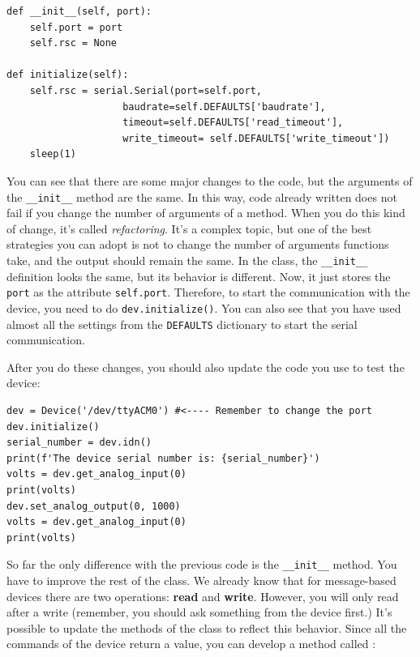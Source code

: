 \begin{verbatim}
def __init__(self, port):
    self.port = port
    self.rsc = None

def initialize(self):
    self.rsc = serial.Serial(port=self.port,
                    baudrate=self.DEFAULTS['baudrate'],
                    timeout=self.DEFAULTS['read_timeout'],
                    write_timeout= self.DEFAULTS['write_timeout'])
    sleep(1)
\end{verbatim}

You can see that there are some major changes to the code, but the arguments of the \texttt{__init__} method are the same. In this way, code already written does not fail if you change the number of arguments of a method. When you do this kind of change, it's called \emph{refactoring}. It's a complex topic, but one of the best strategies you can adopt is not to change the number of arguments functions take, and the output should remain the same. In the class, the \texttt{__init__} definition looks the same, but its behavior is different. Now, it just stores the \texttt{port} as the attribute \texttt{self.port}. Therefore, to start the communication with the device, you need to do \texttt{dev.initialize()}. You can also see that you have used almost all the settings from the \texttt{DEFAULTS} dictionary to start the serial communication.

After you do these changes, you should also update the code you use to test the device:

\begin{verbatim}
dev = Device('/dev/ttyACM0') #<---- Remember to change the port
dev.initialize()
serial_number = dev.idn()
print(f'The device serial number is: {serial_number}')
volts = dev.get_analog_input(0)
print(volts)
dev.set_analog_output(0, 1000)
volts = dev.get_analog_input(0)
print(volts)
\end{verbatim}

\sloppy So far the only difference with the previous code is the \texttt{__init__} method. You have to improve the rest of the class. We already know that for message-based devices there are two operations: \textbf{read} and \textbf{write}. However, you will only read after a write (remember, you should ask something from the device first.) It's possible to update the methods of the class to reflect this behavior. Since all the commands of the device return a value, you can develop a method called :

